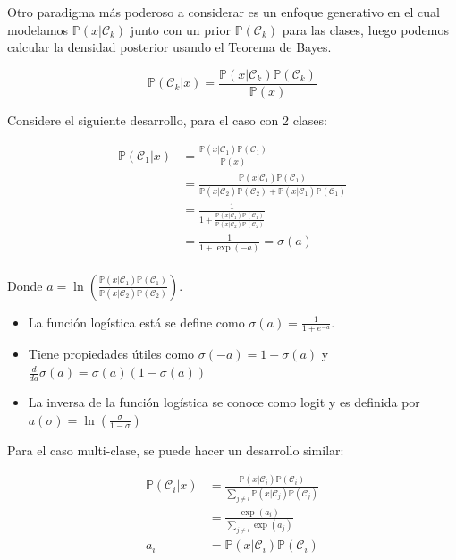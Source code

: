 Otro paradigma más poderoso a considerar es un enfoque generativo en el cual modelamos $\mathbb{P}(x|\mathcal{C}_k)$ junto con un prior $\mathbb{P}(\mathcal{C}_k)$ para las clases, luego podemos calcular la densidad posterior usando el Teorema de Bayes.

\begin{equation}
    \mathbb{P}(\mathcal{C}_k|x) = \frac{\mathbb{P}(x|\mathcal{C}_k)\mathbb{P}(\mathcal{C}_k)}{\mathbb{P}(x)}
\end{equation}

Considere el siguiente desarrollo, para el caso con 2 clases:

\begin{align}
    \mathbb{P}(\mathcal{C}_1|x) &= \frac{\mathbb{P}(x|\mathcal{C}_1)\mathbb{P}(\mathcal{C}_1)}{\mathbb{P}(x)}\\
    &= \frac{\mathbb{P}(x|\mathcal{C}_1)\mathbb{P}(\mathcal{C}_1)}{\mathbb{P}(x|\mathcal{C}_2)\mathbb{P}(\mathcal{C}_2)+\mathbb{P}(x|\mathcal{C}_1)\mathbb{P}(\mathcal{C}_1)}\\
    &=\frac{1}{1+\frac{\mathbb{P}(x|\mathcal{C}_1)\mathbb{P}(\mathcal{C}_1)}{\mathbb{P}(x|\mathcal{C}_2)\mathbb{P}(\mathcal{C}_2)}}\\
    &=\frac{1}{1+\exp(-a)} = \sigma(a)\\
\end{align}

Donde $a = \ln(\frac{\mathbb{P}(x|\mathcal{C}_1)\mathbb{P}(\mathcal{C}_1)}{\mathbb{P}(x|\mathcal{C}_2)\mathbb{P}(\mathcal{C}_2)})$.

\begin{itemize}
    \item La función logística está se define como $\sigma(a) = \frac{1}{1+e^{-a}}$.
    
    \item Tiene propiedades útiles como $\sigma(-a)=1-\sigma(a)$ y $\frac{d}{da}\sigma(a)=\sigma(a)(1-\sigma(a))$
    
    \item La inversa de la función logística se conoce como logit y es definida por $a(\sigma)=\ln(\frac{\sigma}{1-\sigma})$
\end{itemize}

Para el caso multi-clase, se puede hacer un desarrollo similar:

\begin{align}
    \mathbb{P}(\mathcal{C}_i | x) &= \frac{\mathbb{P}(x | \mathcal{C}_i)\mathbb{P}(\mathcal{C}_i)}{\sum_{j\neq i}\mathbb{P}(x | \mathcal{C}_j)\mathbb{P}(\mathcal{C}_j)}\\
    &= \frac{\exp(a_i)}{\sum_{j\neq i}\exp(a_j)}\\
    a_i &= \mathbb{P}(x | \mathcal{C}_i)\mathbb{P}(\mathcal{C}_i)
\end{align}

